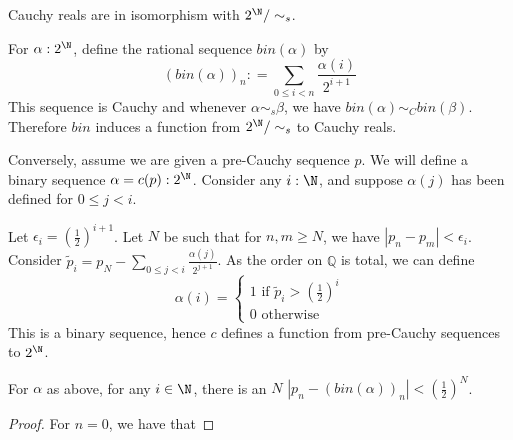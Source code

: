 \begin{proposition}
  Cauchy reals are in isomorphism with $2^\N / \sim_s$. 
\end{proposition} 
\begin{definition}
  For $\alpha: 2^\N$, define the rational sequence $bin(\alpha)$ by 
  \begin{equation} (bin (\alpha))_n :  = \sum\limits_{0 \leq i < n} \frac{\alpha(i)} { 2^{i+1}} \end{equation}  
  This sequence is Cauchy and whenever $\alpha\sim_s \beta$, we have 
  $bin(\alpha) \sim_C bin(\beta)$. 
  Therefore $bin$ induces a function from $2^\N / \sim_s$ to Cauchy reals. 
\end{definition}  
\begin{definition}
  Conversely, assume we are given a pre-Cauchy sequence $p$. 
  We will define a binary sequence $\alpha  = c(p): 2^\N$.
  Consider any $i:\N$, and suppose $\alpha(j)$ has been defined for $0 \leq j<i$. 

  Let $\epsilon_i = (\frac12)^{i+1}$. %
  Let $N$ be such that for $n,m \geq N$, we have $|p_n - p_m| < \epsilon_i$. 
  Consider $\widetilde p_i = p_N - \sum\limits_{0\leq j < i} \frac {\alpha(j)}{2^{j+1}}$.
  As the order on $\mathbb Q$ is total, we can define 
  \begin{equation}
    \alpha(i) = \begin{cases}
    1 \text{ if } \widetilde p_i > (\frac12)^{i} \\
    0 \text{ otherwise } 
    \end{cases} 
  \end{equation}  
  This is a binary sequence, hence $c$ defines a function from pre-Cauchy sequences to $2^\N$.
\end{definition} 
\begin{lemma}
  For $\alpha$ as above, for any $i\in \N$, there is an $N$
  $|p_n-(bin(\alpha))_n| < (\frac{1}{2})^N$. 
\end{lemma}
\begin{proof}
  For $n = 0$, we have that 
\end{proof}  




\newpage
















































